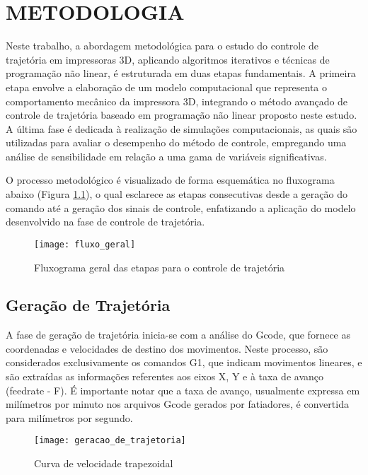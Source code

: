 \chapter{METODOLOGIA}
Neste trabalho, a abordagem metodológica para o estudo do controle de trajetória em impressoras 3D, aplicando algoritmos iterativos e técnicas de programação não linear, é estruturada em duas etapas fundamentais. A primeira etapa envolve a elaboração de um modelo computacional que representa o comportamento mecânico da impressora 3D, integrando o método avançado de controle de trajetória baseado em programação não linear proposto neste estudo. A última fase é dedicada à realização de simulações computacionais, as quais são utilizadas para avaliar o desempenho do método de controle, empregando uma análise de sensibilidade em relação a uma gama de variáveis significativas.

O processo metodológico é visualizado de forma esquemática no fluxograma abaixo (Figura \ref{fig:fluxo_geral}), o qual esclarece as etapas consecutivas desde a geração do comando até a geração dos sinais de controle, enfatizando a aplicação do modelo desenvolvido na fase de controle de trajetória.

\begin{figure}[H]
    \centering
    \caption{Fluxograma geral das etapas para o controle de trajetória}
    \texttt{[image: fluxo\_geral]}

    \label{fig:fluxo_geral}
\end{figure}

\section{Geração de Trajetória}

A fase de geração de trajetória inicia-se com a análise do Gcode, que fornece as coordenadas e velocidades de destino dos movimentos. Neste processo, são considerados exclusivamente os comandos G1, que indicam movimentos lineares, e são extraídas as informações referentes aos eixos X, Y e à taxa de avanço (feedrate - F). É importante notar que a taxa de avanço, usualmente expressa em milímetros por minuto nos arquivos Gcode gerados por fatiadores, é convertida para milímetros por segundo.

\begin{figure}[H]
    \centering
    \caption{Curva de velocidade trapezoidal}
    \texttt{[image: geracao\_de\_trajetoria]}

    \label{fig:geracao_de_trajetoria}
\end{figure}

